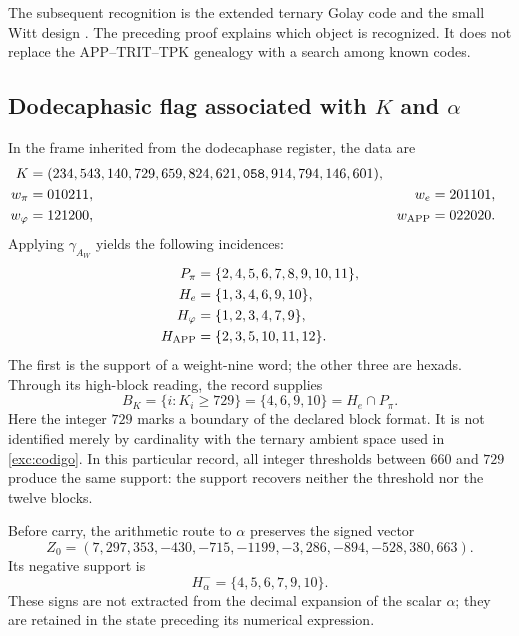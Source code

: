 The subsequent recognition is the extended ternary Golay code and
the small Witt design \cite{conwaysloane}. The preceding proof explains which object is
recognized. It does not replace the APP--TRIT--TPK genealogy with a search
among known codes.

\subsection{Dodecaphasic flag associated with \texorpdfstring{$K$ and $\alpha$}{K and alpha}}
\label{exc:bandera}



In the frame inherited from the dodecaphase register, the data are
\begin{align}
 K={}&(234,543,140,729,659,824,621,\mathtt{058},914,794,146,601),
 \label{exc:k}\\
 w_\pi={}&010211, &w_e={}&201101,\nonumber\\
 w_\varphi={}&121200, &w_{\rm APP}={}&022020.\nonumber
\end{align}
Applying $\gamma_{A_W}$ yields the following incidences:
\begin{align*}
 P_\pi&=\{2,4,5,6,7,8,9,10,11\},\\
 H_e&=\{1,3,4,6,9,10\},\\
 H_\varphi&=\{1,2,3,4,7,9\},\\
 H_{\rm APP}&=\{2,3,5,10,11,12\}.
\end{align*}
The first is the support of a weight-nine word; the other three
are hexads. Through its high-block reading, the record supplies
\begin{equation}
 B_K=\{i:K_i\geq729\}=\{4,6,9,10\}=H_e\cap P_\pi.
 \label{exc:bk}
\end{equation}
Here the integer $729$ marks a boundary of the declared
block format. It is not identified merely by cardinality with the
ternary ambient space used in \eqref{exc:codigo}. In this particular record, all
integer thresholds between $660$ and $729$ produce the same support:
the support recovers neither the threshold nor the twelve blocks.

Before carry, the arithmetic route to $\alpha$ preserves the
signed vector
\begin{equation}
 Z_0=(7,297,353,-430,-715,-1199,-3,286,-894,-528,380,663).
 \label{exc:precarry}
\end{equation}
Its negative support is
\begin{equation}
 H^-_\alpha=\{4,5,6,7,9,10\}.
 \label{exc:halpha}
\end{equation}
These signs are not extracted from the decimal expansion of the scalar
$\alpha$; they are retained in the state preceding its numerical expression.


